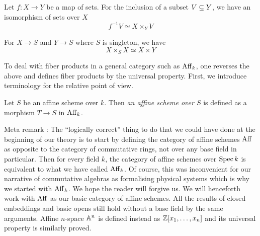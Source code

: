 \documentclass[./main.tex]{subfiles}
\begin{document}
\begin{eg}
  
  Let $f : X \to Y$ be a map of sets.
  For the inclusion of a subset $V \subseteq Y$,
  we have an isomorphism of sets over $X$ \[
    f^{-1}V \simeq X \times_Y V  
  \]
\end{eg}

\begin{eg}
  
  For $X \to S$ and $Y \to S$ where $S$ is singleton,
  we have \[
    X \times_S X \simeq X \times Y  
  \]
\end{eg}

To deal with fiber products in a general category such as $\mathrm{Aff}_k$,
one reverses the above and defines
fiber products by the universal property.
First, we introduce terminology for the relative point of view.

\begin{dfn}
  
  Let $S$ be an affine scheme over $k$.
  Then \emph{an affine scheme over $S$} is defined as
  a morphism $T \to S$ in $\mathrm{Aff}_k$.
\end{dfn}

Meta remark : 
The ``logically correct'' thing to do that we could have done
at the beginning of our theory is to start by defining
the category of affine schemes $\mathrm{Aff}$ as
opposite to the category of commutative rings,
not over any base field in particular.
Then for every field $k$,
the category of affine schemes over $\operatorname{Spec} k$
is equivalent to what we have called $\mathrm{Aff}_k$.
Of course, this was inconvenient for our
narrative of commutative algebras as formalising physical systems
which is why we started with $\mathrm{Aff}_k$.
We hope the reader will forgive us.
We will henceforth work with $\mathrm{Aff}$ as our basic category of affine schemes.
All the results of closed embeddings and basic opens still hold
without a base field by the same arguments.
Affine $n$-space $\mathbb{A}^n$ is defined instead as $\mathbb{Z}[x_1 , \dots , x_n]$
and its universal property is similarly proved.
\end{document}
